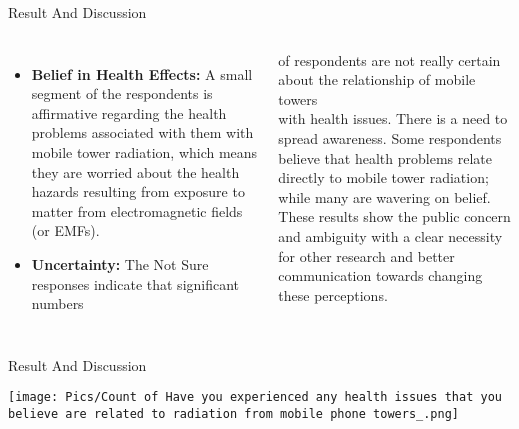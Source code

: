 \documentclass[7pt, aspectratio=169]{beamer}
\begin{document}
\begin{frame}{Result And Discussion}
\begin{columns}
    \begin{itemize}
        \item \textbf{Belief in Health Effects: } A small segment of the respondents is affirmative regarding the health problems associated with them with mobile tower radiation, which means they are worried about the health hazards resulting from exposure to matter from electromagnetic fields (or EMFs).
        \item \textbf{Uncertainty:} The Not Sure responses indicate that significant numbers 
    \end{itemize}

    
    \hspace{0.5cm} of respondents are not really certain\\
    \hspace{0.5cm} about the relationship of mobile towers\\
    \hspace{0.5cm} with health issues. There is a need to\\
    \hspace{0.5cm} spread awareness.
    \vspace{0.2cm}
    Some respondents believe that health problems relate directly to mobile tower radiation; while many are wavering on belief. These results show the public concern and ambiguity with a clear necessity for other research and better communication towards changing these perceptions.
\end{columns}
    
\end{frame}

\begin{frame}{Result And Discussion}
\begin{center}
    \texttt{[image: Pics/Count of Have you experienced any health issues that you believe are related to radiation from mobile phone towers\_.png]}
\end{center}
\end{frame}
\end{document}
